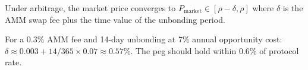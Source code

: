 \begin{proposition}
Under arbitrage, the market price converges to $P_{\text{market}} \in [\rho - \delta, \rho]$ where $\delta$ is the AMM swap fee plus the time value of the unbonding period.
\end{proposition}

For a 0.3\% AMM fee and 14-day unbonding at 7\% annual opportunity cost: $\delta \approx 0.003 + 14/365 \times 0.07 \approx 0.57\%$. The peg should hold within 0.6\% of protocol rate.

